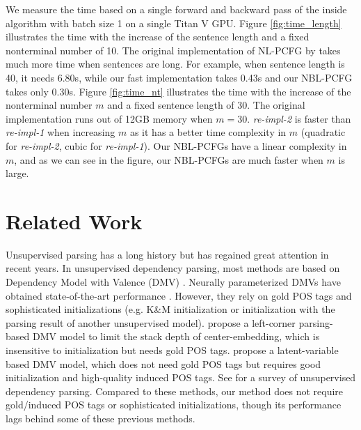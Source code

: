 \documentclass[11pt,a4paper]{article}
\begin{document}
We measure the time based on a single forward and backward pass of the inside algorithm with batch size 1 on a single Titan V GPU.  Figure \ref{fig:time_length} illustrates the time with the increase of the sentence length and a fixed nonterminal number of 10. The original implementation of NL-PCFG by \citet{zhu-etal-2020-return} takes much more time when sentences are long. For example, when sentence length is 40, it needs 6.80s, while our fast implementation takes 0.43s and our NBL-PCFG takes only 0.30s. Figure \ref{fig:time_nt} illustrates the time with the increase of the nonterminal number $m$ and a fixed sentence length of 30. The original implementation runs out of 12GB memory when $m=30$. \emph{re-impl-2} is faster than \emph{re-impl-1} when increasing $m$ as it has a better time complexity in $m$ (quadratic for \emph{re-impl-2}, cubic for \emph{re-impl-1}). Our NBL-PCFGs have a linear complexity in $m$, and as we can see in the figure, our NBL-PCFGs are much faster when $m$ is large.


\section{Related Work}
Unsupervised parsing has a long history but has regained great attention in recent years. In unsupervised dependency parsing, most methods are based on Dependency Model with Valence (DMV) \cite{klein-manning-2004-corpus}. Neurally parameterized DMVs have obtained state-of-the-art performance \cite{jiang-etal-2016-unsupervised, han-etal-2017-dependency, han-etal-2019-enhancing, yang-etal-2020-second}. However, they rely on gold POS tags and sophisticated initializations (e.g. K\&M initialization or initialization with the parsing result of another unsupervised model). \citet{noji-etal-2016-using} propose a left-corner parsing-based DMV model to limit the stack depth of center-embedding, which is insensitive to initialization but needs gold POS tags. \citet{he-etal-2018-unsupervised} propose a latent-variable based DMV model, which does not need gold POS tags but requires good initialization and high-quality induced POS tags. See \citet{han-etal-2020-survey} for a survey of unsupervised dependency parsing.
Compared to these methods, our method does not require gold/induced POS tags or sophisticated initializations, though its performance lags behind some of these previous methods.  
\end{document}
